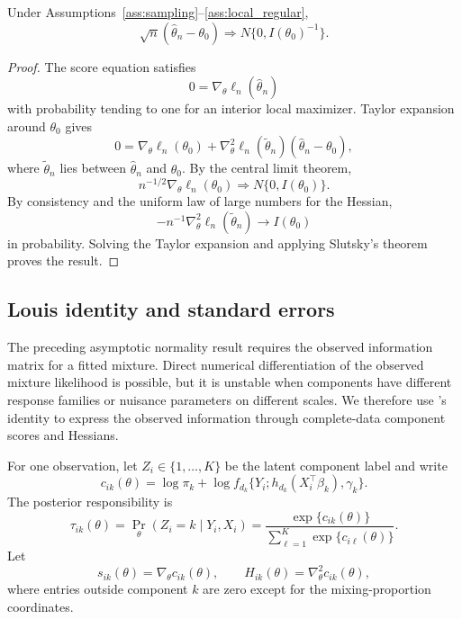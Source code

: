 \begin{theorem}
\label{thm:asymptotic_normality}
Under Assumptions~\ref{ass:sampling}--\ref{ass:local_regular},
\[
    \sqrt n(\hat\theta_n-\theta_0)
    \Rightarrow
    N\{0,I(\theta_0)^{-1}\}.
\]
\end{theorem}

\begin{proof}
The score equation satisfies
\[
    0=\nabla_\theta\ell_n(\hat\theta_n)
\]
with probability tending to one for an interior local maximizer.  Taylor
expansion around \(\theta_0\) gives
\[
    0
    =
    \nabla_\theta\ell_n(\theta_0)
    +
    \nabla_\theta^2\ell_n(\tilde\theta_n)
    (\hat\theta_n-\theta_0),
\]
where \(\tilde\theta_n\) lies between \(\hat\theta_n\) and \(\theta_0\).  By the
central limit theorem,
\[
    n^{-1/2}\nabla_\theta\ell_n(\theta_0)
    \Rightarrow
    N\{0,I(\theta_0)\}.
\]
By consistency and the uniform law of large numbers for the Hessian,
\[
    -n^{-1}\nabla_\theta^2\ell_n(\tilde\theta_n)
    \to
    I(\theta_0)
\]
in probability.  Solving the Taylor expansion and applying Slutsky's theorem
proves the result.
\end{proof}

\subsection{Louis identity and standard errors}
\label{sec:louis_theory}

The preceding asymptotic normality result requires the observed information
matrix for a fitted mixture.  Direct numerical differentiation of the observed
mixture likelihood is possible, but it is unstable when components have
different response families or nuisance parameters on different scales.  We
therefore use \citet{louis1982information}'s identity to express the observed information through
complete-data component scores and Hessians.

For one observation, let \(Z_i\in\{1,\ldots,K\}\) be the latent component label
and write
\[
    c_{ik}(\theta)
    =
    \log \pi_k+\log f_{d_k}\{Y_i;h_{d_k}(X_i^\top\beta_k),\gamma_k\}.
\]
The posterior responsibility is
\[
    \tau_{ik}(\theta)
    =
    \Pr_\theta(Z_i=k\mid Y_i,X_i)
    =
    \frac{\exp\{c_{ik}(\theta)\}}
    {\sum_{\ell=1}^K\exp\{c_{i\ell}(\theta)\}}.
\]
Let
\[
    s_{ik}(\theta)=\nabla_\theta c_{ik}(\theta),
    \qquad
    H_{ik}(\theta)=\nabla_\theta^2 c_{ik}(\theta),
\]
where entries outside component \(k\) are zero except for the
mixing-proportion coordinates.

